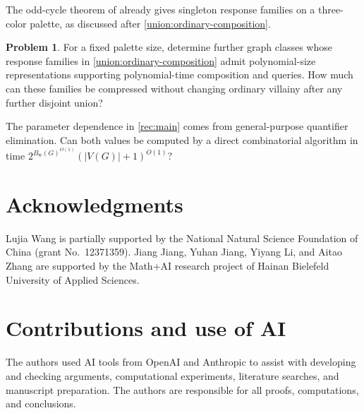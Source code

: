\documentclass[10pt,a4paper]{amsart}
\numberwithin{equation}{section}
\theoremstyle{definition}
\newtheorem{problem}[theorem]{Problem}
\theoremstyle{remark}
\begin{document}
The odd-cycle theorem of \cite[Theorem~3.15]{jiang2026exact} already
gives singleton response families on a three-color palette, as discussed
after \cref{union:ordinary-composition}.
\begin{problem}\label{problem:response-compression}
For a fixed palette size, determine further graph classes whose response
families in \cref{union:ordinary-composition} admit polynomial-size
representations supporting polynomial-time composition and queries.
How much can these families be compressed without changing ordinary
villainy after any further disjoint union?
\end{problem}

The parameter dependence in \cref{rec:main} comes from general-purpose
quantifier elimination. Can both values be computed by a direct
combinatorial algorithm in time
$2^{B_{\mathrm w}(G)^{O(1)}}(|V(G)|+1)^{O(1)}$?

\section*{Acknowledgments}

Lujia Wang is partially supported by the National Natural Science
Foundation of China (grant No.~12371359). Jiang Jiang, Yuhan Jiang,
Yiyang Li, and Aitao Zhang are
supported by the Math+AI research project of Hainan Bielefeld University
of Applied Sciences.

\section*{Contributions and use of AI}

The authors used AI tools from OpenAI and Anthropic to assist with developing and
checking arguments, computational experiments, literature searches,
and manuscript preparation.
The authors are responsible for all proofs, computations, and conclusions.
\end{document}
